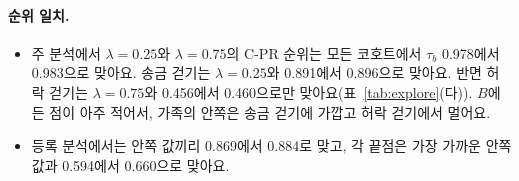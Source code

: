 \paragraph{순위 일치.}
\begin{itemize}
\item 주 분석에서 $\lambda=0.25$와 $\lambda=0.75$의 C-PR 순위는 모든 코호트에서 $\tau_b$ 0.978에서 0.983으로 맞아요. 송금 걷기는 $\lambda=0.25$와 0.891에서 0.896으로 맞아요. 반면 허락 걷기는 $\lambda=0.75$와 0.456에서 0.460으로만 맞아요(표~\ref{tab:explore}(다)). $B$에 든 점이 아주 적어서, 가족의 안쪽은 송금 걷기에 가깝고 허락 걷기에서 멀어요.
\item 등록 분석에서는 안쪽 값끼리 0.869에서 0.884로 맞고, 각 끝점은 가장 가까운 안쪽 값과 0.594에서 0.660으로 맞아요.
\end{itemize}
